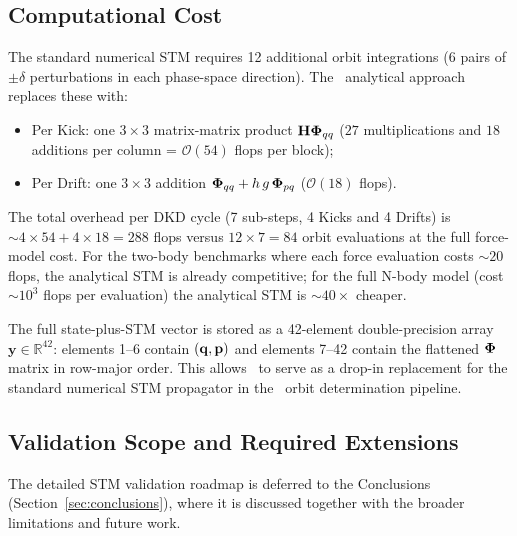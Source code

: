 \subsection{Computational Cost}
\label{sec:stm_cost}

The standard numerical STM requires 12 additional orbit
integrations (6 pairs of $\pm\delta$ perturbations in each
phase-space direction). The \AAS\ analytical approach replaces
these with:
\begin{itemize}
  \item Per Kick: one $3\times3$ matrix-matrix product
    $\mathbf{H}\boldsymbol{\Phi}_{qq}$ ($27$ multiplications and $18$
    additions per column = $\mathcal{O}(54)$ flops per block);
  \item Per Drift: one $3\times3$ addition
    $\boldsymbol{\Phi}_{qq} + h\,g\,\boldsymbol{\Phi}_{pq}$ ($\mathcal{O}(18)$ flops).
\end{itemize}
The total overhead per DKD cycle (7 sub-steps, 4 Kicks and 4
Drifts) is $\sim 4\times54 + 4\times18 = 288$ flops versus
$12 \times 7 = 84$ orbit evaluations at the full force-model cost.
For the two-body benchmarks where each force evaluation costs
$\sim 20$ flops, the analytical STM is already competitive;
for the full N-body model (cost $\sim 10^3$ flops per evaluation)
the analytical STM is $\sim 40\times$ cheaper.

The full state-plus-STM vector is stored as a 42-element
double-precision array $\mathbf{y} \in \mathbb{R}^{42}$:
elements 1--6 contain $(\mathbf{q}, \mathbf{p})$ and elements 7--42 contain
the flattened $\boldsymbol{\Phi}$ matrix in row-major order. This allows
\AAS\ to serve as a drop-in replacement for the standard
numerical STM propagator in the \astdyn\ orbit determination
pipeline.

\subsection{Validation Scope and Required Extensions}
\label{sec:stm_validation_scope}

The detailed STM validation roadmap is deferred to the
Conclusions (Section~\ref{sec:conclusions}), where it is
discussed together with the broader limitations and future work.
